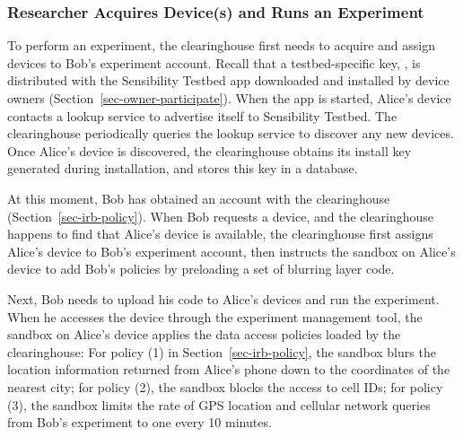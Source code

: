 \subsubsection{Researcher Acquires Device(s) and Runs an
Experiment}\label{sec-acquire-run}

To perform an experiment, the clearinghouse first needs to 
acquire and assign devices to Bob's experiment account. 
Recall that a testbed-specific key, , is distributed
with the Sensibility Testbed app downloaded and installed by device
owners (Section~\ref{sec-owner-participate}). When the app is started, 
Alice's device contacts a lookup service to advertise itself to Sensibility 
Testbed. 
The clearinghouse periodically queries the lookup service to
discover any new devices. Once Alice's device is discovered, the
clearinghouse obtains its install key  generated
during installation, and stores this key in a database. 

At this moment,  Bob has obtained an account with the clearinghouse 
(Section~\ref{sec-irb-policy}).
When Bob requests a device, and the clearinghouse
happens to find that Alice's device is available, the
clearinghouse first 
assigns Alice's device to Bob's experiment account, then instructs 
the sandbox on Alice's device to add Bob's policies by preloading
a set of blurring layer code.

Next, Bob needs to upload his code to Alice's devices and 
run the experiment. When he accesses the device through
the experiment management tool, the sandbox on Alice's device 
applies the data access policies loaded by the clearinghouse: For policy (1) in
Section~\ref{sec-irb-policy}, the sandbox blurs the location
information returned from Alice's phone down to the coordinates
of the nearest city; for policy (2), the sandbox blocks the
access to cell IDs; for policy (3), the sandbox limits the rate
of GPS location and cellular network queries from Bob's
experiment to one every 10 minutes.

